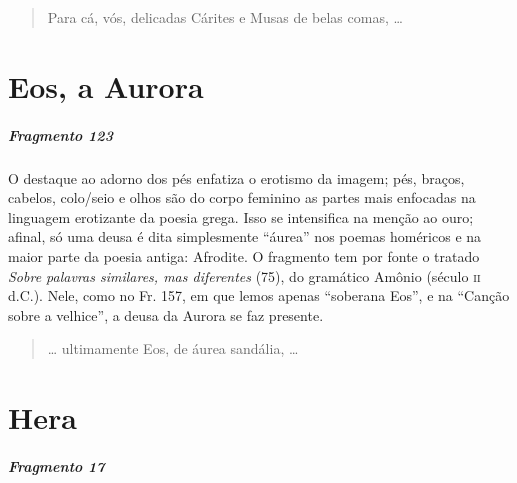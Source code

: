 {\begin{verse}
Para cá, vós, delicadas Cárites e Musas de belas \qb{}comas, \ldots{}
\end{verse}


\chapter{Eos, a Aurora}

\paragraph{Fragmento 123}

{\small O destaque ao adorno dos pés enfatiza o erotismo da imagem; pés, braços,
cabelos, colo/seio e olhos são do corpo feminino as partes mais enfocadas na
linguagem erotizante da poesia grega. Isso se intensifica na menção ao ouro;
afinal, só uma deusa é dita simplesmente ``áurea” nos poemas homéricos
e na maior parte da poesia antiga: Afrodite. O fragmento tem por fonte o
tratado \textit{Sobre palavras similares, mas diferentes} (75), do gramático Amônio
(século \textsc{ii} d.C.).
Nele, como no Fr. 157, em que lemos apenas ``soberana Eos'', e na ``Canção sobre a velhice'', a deusa da Aurora se faz presente.}

\begin{verse}
\ldots{} ultimamente Eos, de áurea sandália, \ldots{}
\end{verse}


\chapter{Hera}

\paragraph{Fragmento 17}

}
